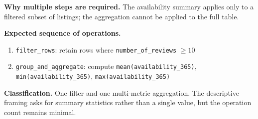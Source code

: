 \textbf{Why multiple steps are required.}
The availability summary applies only to a filtered subset of listings; the
aggregation cannot be applied to the full table.

\textbf{Expected sequence of operations.}
\begin{enumerate}
  \item \texttt{filter\_rows}: retain rows where \texttt{number\_of\_reviews}
    $\geq 10$
  \item \texttt{group\_and\_aggregate}: compute \texttt{mean(availability\_365)},
    \texttt{min(availability\_365)}, \texttt{max(availability\_365)}
\end{enumerate}

\textbf{Classification.}
One filter and one multi-metric aggregation. The descriptive framing asks for
summary statistics rather than a single value, but the operation count remains
minimal.